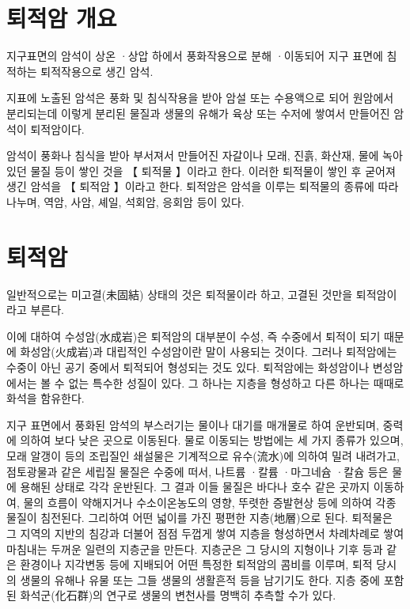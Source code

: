 \documentclass[12pt, a4paper, twoside]{book}
\begin{document}
	\clearpage
	\section{퇴적암 개요}

			지구표면의 암석이 상온 ·상압 하에서 풍화작용으로 분해 ·이동되어 지구 표면에 침적하는 퇴적작용으로 생긴 암석.
			
			지표에 노출된 암석은 풍화 및 침식작용을 받아 암설 또는 수용액으로 되어 원암에서 분리되는데 
			이렇게 분리된 물질과 생물의 유해가 육상 또는 수저에 쌓여서 만들어진 암석이 퇴적암이다. 
			
			암석이 풍화나 침식을 받아 부서져서 만들어진 자갈이나 모래, 진흙, 화산재, 물에 녹아 있던 물질 등이 쌓인 것을 【 퇴적물 】이라고 한다. 
			이러한 퇴적물이 쌓인 후 굳어져 생긴 암석을 【 퇴적암 】이라고 한다. 
			퇴적암은 암석을 이루는 퇴적물의 종류에 따라 나누며, 역암, 사암, 셰일, 석회암, 응회암 등이 있다.







	\clearpage
	\section{퇴적암}

				일반적으로는 미고결(未固結) 상태의 것은 퇴적물이라 하고, 고결된 것만을 퇴적암이라고 부른다. 
				
				이에 대하여 수성암(水成岩)은 퇴적암의 대부분이 수성, 즉 수중에서 퇴적이 되기 때문에 
				화성암(火成岩)과 대립적인 수성암이란 말이 사용되는 것이다. 
				그러나 퇴적암에는 수중이 아닌 공기 중에서 퇴적되어 형성되는 것도 있다. 
				퇴적암에는 화성암이나 변성암에서는 볼 수 없는 특수한 성질이 있다. 그 하나는 지층을 형성하고 다른 하나는 때때로 화석을 함유한다.
				
				지구 표면에서 풍화된 암석의 부스러기는 물이나 대기를 매개물로 하여 운반되며, 중력에 의하여 보다 낮은 곳으로 이동된다. 
				물로 이동되는 방법에는 세 가지 종류가 있으며, 모래 알갱이 등의 조립질인 쇄설물은 기계적으로 유수(流水)에 의하여 밀려 내려가고, 
				점토광물과 같은 세립질 물질은 수중에 떠서, 나트륨 ·칼륨 ·마그네슘 ·칼슘 등은 물에 용해된 상태로 각각 운반된다. 
				그 결과 이들 물질은 바다나 호수 같은 곳까지 이동하여, 물의 흐름이 약해지거나 수소이온농도의 영향, 뚜렷한 증발현상 등에 의하여 
				각종 물질이 침전된다. 
				그리하여 어떤 넓이를 가진 평편한 지층(地層)으로 된다. 
				퇴적물은 그 지역의 지반의 침강과 더불어 점점 두껍게 쌓여 지층을 형성하면서 차례차례로 쌓여 마침내는 두꺼운 일련의 지층군을 만든다. 
				지층군은 그 당시의 지형이나 기후 등과 같은 환경이나 지각변동 등에 지배되어 어떤 특정한 퇴적암의 콤비를 이루며, 
				퇴적 당시의 생물의 유해나 유물 또는 그들 생물의 생활흔적 등을 남기기도 한다. 
				지층 중에 포함된 화석군(化石群)의 연구로 생물의 변천사를 명백히 추측할 수가 있다. 
				
\end{document}
